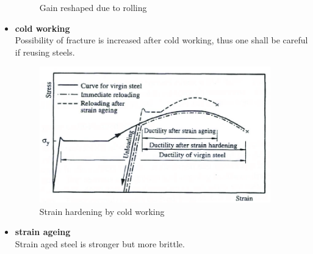 \begin{itemize}
\begin{figure}[H]
\caption{Gain reshaped due to rolling}
\end{figure}
\item \textbf{cold working}\\
Possibility of fracture is increased after cold working, thus one shall be careful if reusing steels.
\begin{figure}[H]
\centering\footnotesize
\includegraphics[width=10cm]{PIC/CH02/SH}
\caption{Strain hardening by cold working}
\end{figure}
\item \textbf{strain ageing}\\
Strain aged steel is stronger but more brittle.


\end{itemize}
